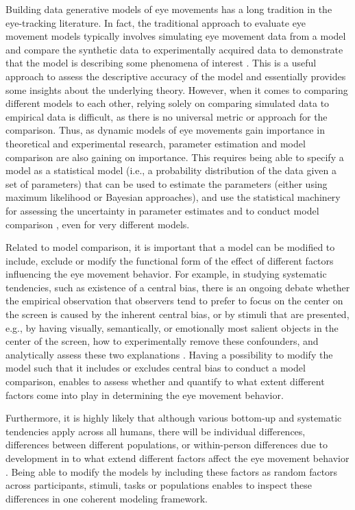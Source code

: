 \documentclass{article}
\begin{document}
Building data generative models of eye movements has a long tradition in the eye-tracking literature. In fact, the traditional approach to evaluate eye movement models typically involves simulating eye movement data from a model and compare the synthetic data to experimentally acquired data to demonstrate that the model is describing some phenomena of interest \citep{schutt2017likelihood}. This is a useful approach to assess the descriptive accuracy of the model and essentially provides some insights about the underlying theory. However, when it comes to comparing different models to each other, relying solely on comparing simulated data to empirical data is difficult, as there is no universal metric or approach for the comparison. Thus, as dynamic models of eye movements gain importance in theoretical and experimental research, parameter estimation and model comparison are also gaining on importance. This requires being able to specify a model as a statistical model (i.e., a probability distribution of the data given a set of parameters) that can be used to estimate the parameters (either using maximum likelihood or Bayesian approaches), and use the statistical machinery for assessing the uncertainty in parameter estimates and to conduct model comparison \citep{schutt2017likelihood,malem2020exploration}, even for very different models.

Related to model comparison, it is important that a model can be modified to include, exclude or modify the functional form of the effect of different factors influencing the eye movement behavior. For example, in studying systematic tendencies, such as existence of a central bias, there is an ongoing debate whether the empirical observation that observers tend to prefer to focus on the center on the screen is caused by the inherent central bias, or by stimuli that are presented, e.g., by having visually, semantically, or emotionally most salient objects in the center of the screen, how to experimentally remove these confounders, and analytically assess these two explanations \citep{tatler2007central,renswoude2019central,tseng2009quantifying}. Having a possibility to modify the model such that it includes or excludes central bias to conduct a model comparison, enables to assess whether and quantify to what extent different factors come into play in determining the eye movement behavior. 

Furthermore, it is highly likely that although various bottom-up and systematic tendencies apply across all humans, there will be individual differences, differences between different populations, or within-person differences due to development in to what extend different factors affect the eye movement behavior \citep{de2019individual}. Being able to modify the models by including these factors as random factors across participants, stimuli, tasks or populations enables to inspect these differences in one coherent modeling framework.
\end{document}
